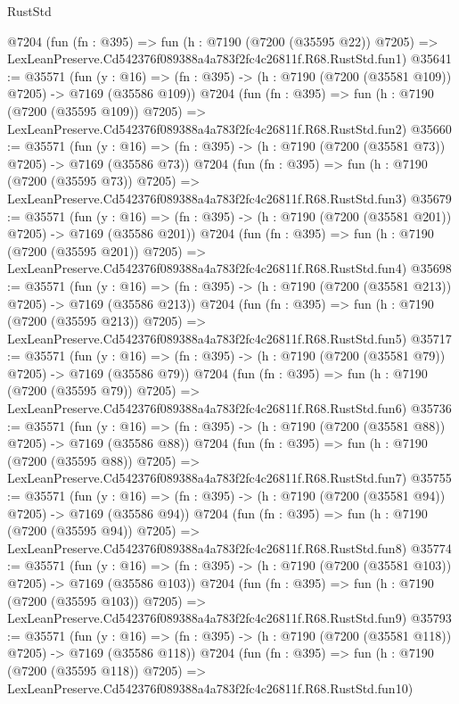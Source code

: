 \begin{lexlean}{RustStd}
\begin{coremodule}
    @7204
    (fun (fn : @395) =>
    fun (h : @7190 (@7200 (@35595 @22)) @7205) =>
    LexLeanPreserve.Cd542376f089388a4a783f2fc4c26811f.R68.RustStd.fun1)
@35641 := @35571
    (fun (y : @16) => (fn : @395) -> (h : @7190 (@7200 (@35581 @109)) @7205) -> @7169 (@35586 @109))
    @7204
    (fun (fn : @395) =>
    fun (h : @7190 (@7200 (@35595 @109)) @7205) =>
    LexLeanPreserve.Cd542376f089388a4a783f2fc4c26811f.R68.RustStd.fun2)
@35660 := @35571
    (fun (y : @16) => (fn : @395) -> (h : @7190 (@7200 (@35581 @73)) @7205) -> @7169 (@35586 @73))
    @7204
    (fun (fn : @395) =>
    fun (h : @7190 (@7200 (@35595 @73)) @7205) =>
    LexLeanPreserve.Cd542376f089388a4a783f2fc4c26811f.R68.RustStd.fun3)
@35679 := @35571
    (fun (y : @16) => (fn : @395) -> (h : @7190 (@7200 (@35581 @201)) @7205) -> @7169 (@35586 @201))
    @7204
    (fun (fn : @395) =>
    fun (h : @7190 (@7200 (@35595 @201)) @7205) =>
    LexLeanPreserve.Cd542376f089388a4a783f2fc4c26811f.R68.RustStd.fun4)
@35698 := @35571
    (fun (y : @16) => (fn : @395) -> (h : @7190 (@7200 (@35581 @213)) @7205) -> @7169 (@35586 @213))
    @7204
    (fun (fn : @395) =>
    fun (h : @7190 (@7200 (@35595 @213)) @7205) =>
    LexLeanPreserve.Cd542376f089388a4a783f2fc4c26811f.R68.RustStd.fun5)
@35717 := @35571
    (fun (y : @16) => (fn : @395) -> (h : @7190 (@7200 (@35581 @79)) @7205) -> @7169 (@35586 @79))
    @7204
    (fun (fn : @395) =>
    fun (h : @7190 (@7200 (@35595 @79)) @7205) =>
    LexLeanPreserve.Cd542376f089388a4a783f2fc4c26811f.R68.RustStd.fun6)
@35736 := @35571
    (fun (y : @16) => (fn : @395) -> (h : @7190 (@7200 (@35581 @88)) @7205) -> @7169 (@35586 @88))
    @7204
    (fun (fn : @395) =>
    fun (h : @7190 (@7200 (@35595 @88)) @7205) =>
    LexLeanPreserve.Cd542376f089388a4a783f2fc4c26811f.R68.RustStd.fun7)
@35755 := @35571
    (fun (y : @16) => (fn : @395) -> (h : @7190 (@7200 (@35581 @94)) @7205) -> @7169 (@35586 @94))
    @7204
    (fun (fn : @395) =>
    fun (h : @7190 (@7200 (@35595 @94)) @7205) =>
    LexLeanPreserve.Cd542376f089388a4a783f2fc4c26811f.R68.RustStd.fun8)
@35774 := @35571
    (fun (y : @16) => (fn : @395) -> (h : @7190 (@7200 (@35581 @103)) @7205) -> @7169 (@35586 @103))
    @7204
    (fun (fn : @395) =>
    fun (h : @7190 (@7200 (@35595 @103)) @7205) =>
    LexLeanPreserve.Cd542376f089388a4a783f2fc4c26811f.R68.RustStd.fun9)
@35793 := @35571
    (fun (y : @16) => (fn : @395) -> (h : @7190 (@7200 (@35581 @118)) @7205) -> @7169 (@35586 @118))
    @7204
    (fun (fn : @395) =>
    fun (h : @7190 (@7200 (@35595 @118)) @7205) =>
    LexLeanPreserve.Cd542376f089388a4a783f2fc4c26811f.R68.RustStd.fun10)

\end{coremodule}
\end{lexlean}
